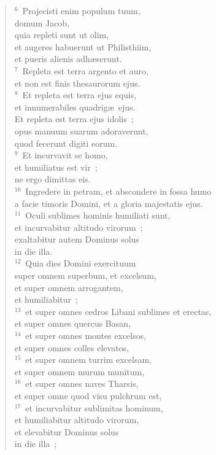 \begin{verse}${}^{6}$~Projecisti enim populum tuum,\\ domum Jacob,\\ quia repleti sunt ut olim,\\ et augeres habuerunt ut Philisthiim,\\ et pueris alienis adh\ae serunt.\\
${}^{7}$~Repleta est terra argento et auro,\\ et non est finis thesaurorum ejus.\\
${}^{8}$~Et repleta est terra ejus equis,\\ et innumerabiles quadrig\ae\ ejus.\\ Et repleta est terra ejus idolis~;\\ opus manuum suarum adoraverunt,\\ quod fecerunt digiti eorum.\\
${}^{9}$~Et incurvavit se homo,\\ et humiliatus est vir~;\\ ne ergo dimittas eis.\\
${}^{10}$~Ingredere in petram, et abscondere in fossa humo\\ a facie timoris Domini, et a gloria majestatis ejus.\\
${}^{11}$~Oculi sublimes hominis humiliati sunt,\\ et incurvabitur altitudo virorum~;\\ exaltabitur autem Dominus solus\\ in die illa.\\
${}^{12}$~Quia dies Domini exercituum\\ super omnem superbum, et excelsum,\\ et super omnem arrogantem,\\ et humiliabitur~;\\
${}^{13}$~et super omnes cedros Libani sublimes et erectas,\\ et super omnes quercus Basan,\\
${}^{14}$~et super omnes montes excelsos,\\ et super omnes colles elevatos,\\
${}^{15}$~et super omnem turrim excelsam,\\ et super omnem murum munitum,\\
${}^{16}$~et super omnes naves Tharsis,\\ et super omne quod visu pulchrum est,\\
${}^{17}$~et incurvabitur sublimitas hominum,\\ et humiliabitur altitudo virorum,\\ et elevabitur Dominus solus\\ in die illa~;\\

\end{verse}
